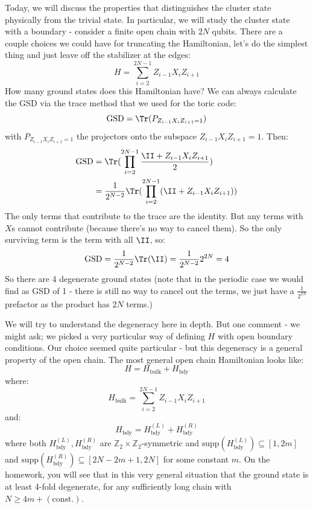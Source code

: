 Today, we will discuss the properties that distinguishes the cluster state physically from the trivial state. In particular, we will study the cluster state with a boundary - consider a finite open chain with $2N$ qubits. There are a couple choices we could have for truncating the Hamiltonian, let's do the simplest thing and just leave off the stabilizer at the edges:
\begin{equation}
    H = \sum_{i=2}^{2N-1}Z_{i-1}X_iZ_{i+1}
\end{equation}
How many ground states does this Hamiltonian have? We can always calculate the GSD via the trace method that we used for the toric code:
\begin{equation}
    \text{GSD} = \Tr(P_{Z_{i-1}X_iZ_{i+1}=1})
\end{equation}
with $P_{Z_{i-1}X_iZ_{i+1}=1}$ the projectors onto the subspace $Z_{i-1}X_iZ_{i+1} = 1$. Then:
\begin{equation}
    \begin{split}
        \text{GSD} &= \Tr(\prod_{i=2}^{2N-1}\frac{\II + Z_{i-1}X_iZ_{i+1}}{2})
        \\ &= \frac{1}{2^{N-2}}\Tr(\prod_{i=2}^{2N-1}(\II + Z_{i-1}X_iZ_{i+1}))
    \end{split}
\end{equation}
The only terms that contribute to the trace are the identity. But any terms with $X$s cannot contribute (because there's no way to cancel them). So the only surviving term is the term with all $\II$, so:
\begin{equation}
    \text{GSD} = \frac{1}{2^{N-2}}\Tr(\II) = \frac{1}{2^{N-2}}2^{2N} = 4
\end{equation}
So there are 4 degenerate ground states (note that in the periodic case we would find as GSD of 1 - there is still no way to cancel out the terms, we just have a $\frac{1}{2^{2N}}$ prefactor as the product has $2N$ terms.)

We will try to understand the degeneracy here in depth. But one comment - we might ask; we picked a very particular way of defining $H$ with open boundary conditions. Our choice seemed quite particular - but this degeneracy is a general property of the open chain. The most general open chain Hamiltonian looks like:
\begin{equation}
    H = H_{\text{bulk}} + H_{\text{bdy}}
\end{equation}
where:
\begin{equation}
    H_{\text{bulk}} = \sum_{i=2}^{2N-1}Z_{i-1}X_iZ_{i+1}
\end{equation}
and:
\begin{equation}
    H_{\text{bdy}} = H^{(L)}_{\text{bdy}} + H^{(R)}_{\text{bdy}}
\end{equation}
where both $H^{(L)}_{\text{bdy}}, H^{(R)}_{\text{bdy}}$ are $\mathbb{Z}_2 \times \mathbb{Z}_2$-symmetric and $\text{supp}(H^{(L)}_{\text{bdy}}) \subseteq [1, 2m]$ and $\text{supp}(H^{(R)}_{\text{bdy}}) \subseteq [2N-2m+1, 2N]$ for some constant $m$. On the homework, you will see that in this very general situation that the ground state is at least 4-fold degenerate, for any sufficiently long chain with $N \geq 4m+(\text{const.})$.

